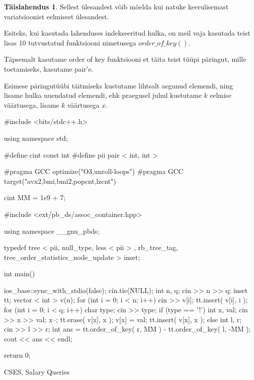 \documentclass{trkut}
\theoremstyle{definition}
\newtheorem*{solution}{Täislahendus}
\begin{document}
\begin{solution}
Sellest ülesandest võib mõelda kui natuke keerulisemast variatsioonist eelmisest ülesandest.

Esiteks, kui kasutada lahenduses indekseeritud hulka, on meil vaja kasutada teist lisas 10 tutvustatud funktsiooni nimetusega $order\_of\_key()$.

Täpsemalt kasutame order of key funktsiooni et täita teist tüüpi päringut, mille toetamiseks, kasutame pair'e.

Esimese päringutüübi täitmiseks kustutame lihtsalt aegunud elemendi, ning lisame hulka uuendatud elemendi, ehk praegusel juhul kustutame $k$ eelmise väärtusega, lisame $k$ väärtusega $x$.
\end{solution}
\begin{cclol}
#include <bits/stdc++.h>

using namespace std;

#define cint
const int
#define pii pair < int, int >

#pragma GCC optimize("O3,unroll-loops")
#pragma GCC target("avx2,bmi,bmi2,popcnt,lzcnt")

cint MM = 1e9 + 7;

#include <ext/pb_ds/assoc_container.hpp>

using namespace __gnu_pbds;

typedef tree < pii, null_type, less < pii > , rb_tree_tag, 
tree_order_statistics_node_update > inset;

int main() {
  ios_base::sync_with_stdio(false);
  cin.tie(NULL);
  int n, q;
  cin >> n >> q;
  inset tt;
  vector < int > v(n);
  for (int i = 0; i < n; i++) {
    cin >> v[i];
    tt.insert({
      v[i],
      i
    });
  }
  for (int i = 0; i < q; i++) {
    char type;
    cin >> type;
    if (type == '!') {
      int x, val;
      cin >> x >> val;
      x--;
      tt.erase({
        v[x],
        x
      });
      v[x] = val;
      tt.insert({
        v[x],
        x
      });
    } else {
      int l, r;
      cin >> l >> r;
      int ans = tt.order_of_key({
        r,
        MM
      }) - tt.order_of_key({
        l,
        -MM
      });
      cout << ans << endl;
    }
  }

  return 0;
}
    \end{cclol}
    \begin{kk}[H]
    \caption{CSES, Salary Queries}%
    \end{kk}
\end{document}
